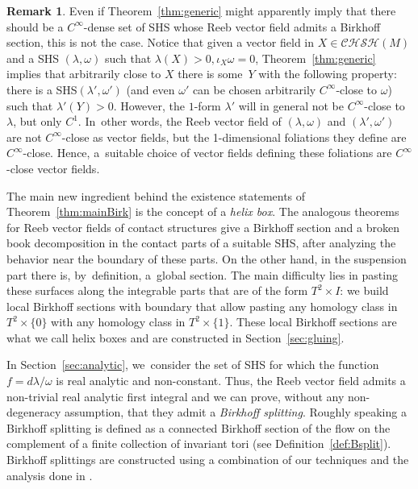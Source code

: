 \documentclass[JEP,XML,SOM,Unicode,NoEqCountersInSection,NoFloatCountersInSection,published]{cedram}
\theoremstyle{definition}
\newtheorem{Remark}[theorem]{Remark}
\begin{document}
\begin{Remark}
Even if Theorem~\ref{thm:generic} might apparently imply that there should be a $C^\infty$-dense set of SHS whose Reeb vector field admits a Birkhoff section, this is not the case. Notice that given a vector field in $X\in \mathcal{CHSH}(M)$ and a SHS $(\lambda,\omega)$ such that $\lambda(X)>0, \iota_X\omega=0$, Theorem~\ref{thm:generic} implies that arbitrarily close to $X$ there is some~$Y$ with the following property: there is a SHS$(\lambda',\omega')$ (and even $\omega'$ can be chosen arbitrarily $C^\infty$-close to $\omega$) such that $\lambda'(Y)>0$. However, the $1$-form $\lambda'$ will in general not be $C^\infty$-close to $\lambda$, but only $C^1$. In~other words, the Reeb vector field of $(\lambda,\omega)$ and $(\lambda',\omega')$ are not $C^\infty$-close as vector fields, but the 1-dimensional foliations they define are $C^\infty$-close. Hence, a~suitable choice of vector fields defining these foliations are $C^\infty$-close vector fields.
\end{Remark}

The main new ingredient behind the existence statements of Theorem~\ref{thm:mainBirk} is the concept of a \emph{helix box}. The analogous theorems for Reeb vector fields of contact structures give a Birkhoff section and a broken book decomposition in the contact parts of a suitable SHS, after analyzing the behavior near the boundary of these parts. On the other hand, in the suspension part there is, by~definition, a~global section. The main difficulty lies in pasting these surfaces along the integrable parts that are of the form $T^2\times I$: we build local Birkhoff sections with boundary that allow pasting any homology class in $T^2\times\{0\}$ with any homology class in $T^2\times\{1\}$. These local Birkhoff sections are what we call helix boxes and are constructed in Section~\ref{sec:gluing}.

In Section~\ref{sec:analytic}, we~consider the set of SHS for which the function $f=d\lambda/\omega$ is real analytic and non-constant. Thus, the Reeb vector field admits a non-trivial real analytic first integral and we can prove, without any non-degeneracy assumption, that they admit a \emph{Birkhoff splitting}.
Roughly speaking a Birkhoff splitting is defined as a connected Birkhoff section of the flow on the complement of a finite collection of invariant tori (see Definition~\ref{def:Bsplit}). Birkhoff splittings are constructed using a combination of our techniques and the analysis done in \cite{CV2}.
\end{document}
